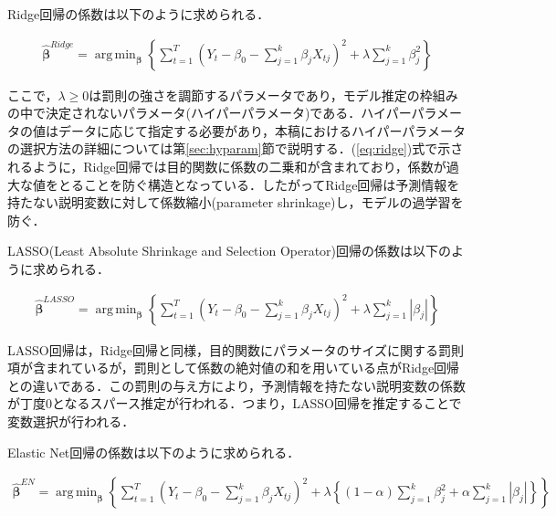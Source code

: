 \documentclass[a4paper，11pt]{jsarticle}
\DeclareMathOperator*{\argmin}{arg\,min}
\begin{document}
Ridge回帰の係数は以下のように求められる．

\begin{equation} \label{eq:ridge}
  \begin{split}
    \hat{\bm{\beta}}^{Ridge} = \argmin_{\bm{\beta}}\left\{ \sum_{t=1}^{T} \left( Y_t - \beta_0 - \sum_{j=1}^{k} \beta_{j} X_{tj} \right)^2 + \lambda \sum_{j=1}^{k} \beta_{j}^{2} \right\}
  \end{split}
\end{equation}

ここで，$\lambda \geq 0$は罰則の強さを調節するパラメータであり，モデル推定の枠組みの中で決定されないパラメータ(ハイパーパラメータ)である．ハイパーパラメータの値はデータに応じて指定する必要があり，本稿におけるハイパーパラメータの選択方法の詳細については第\ref{sec:hyparam}節で説明する．(\ref{eq:ridge})式で示されるように，Ridge回帰では目的関数に係数の二乗和が含まれており，係数が過大な値をとることを防ぐ構造となっている．したがってRidge回帰は予測情報を持たない説明変数に対して係数縮小(parameter shrinkage)し，モデルの過学習を防ぐ．

LASSO(Least Absolute Shrinkage and Selection Operator)回帰の係数は以下のように求められる．

\begin{equation} \label{eq:lasso}
  \begin{split}
    \hat{\bm{\beta}}^{LASSO} = \argmin_{\bm{\beta}}\left\{ \sum_{t=1}^{T} \left( Y_t - \beta_0 - \sum_{j=1}^{k} \beta_{j} X_{tj} \right)^2 + \lambda \sum_{j=1}^{k} \left|\beta_{j}\right| \right\}
  \end{split}
\end{equation}

LASSO回帰は，Ridge回帰と同様，目的関数にパラメータのサイズに関する罰則項が含まれているが，罰則として係数の絶対値の和を用いている点がRidge回帰との違いである．この罰則の与え方により，予測情報を持たない説明変数の係数が丁度0となるスパース推定が行われる．つまり，LASSO回帰を推定することで変数選択が行われる．

Elastic Net回帰の係数は以下のように求められる．

\begin{equation}
  \begin{split}
    \hat{\bm{\beta}}^{EN} = \argmin_{\bm{\beta}}\left\{ \sum_{t=1}^{T} \left( Y_t - \beta_0 - \sum_{j=1}^{k} \beta_{j} X_{tj} \right)^2 + 
    \lambda \left\{ 
      \left( 1 - \alpha \right) \sum_{j=1}^{k} \beta_{j}^2 + 
      \alpha \sum_{j=1}^{k} \left|\beta_{j}\right| 
      \right\} 
    \right\}
  \end{split}
\end{equation}
\end{document}

